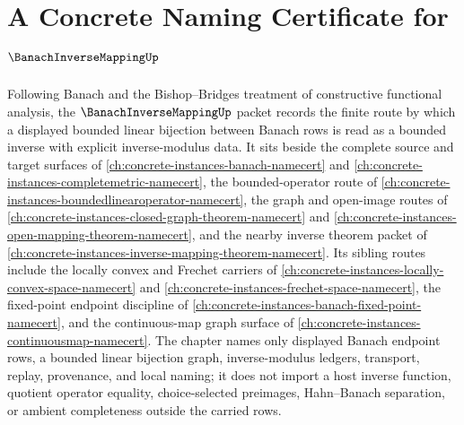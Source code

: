 \chapter{A Concrete Naming Certificate for $\BanachInverseMappingUp$}
\label{ch:concrete-instances-banach-inverse-mapping-namecert}

Following Banach and the Bishop--Bridges treatment of constructive functional analysis, the $\BanachInverseMappingUp$ packet records the finite route by which a displayed bounded linear bijection between Banach rows is read as a bounded inverse with explicit inverse-modulus data. It sits beside the complete source and target surfaces of \autoref{ch:concrete-instances-banach-namecert} and \autoref{ch:concrete-instances-completemetric-namecert}, the bounded-operator route of \autoref{ch:concrete-instances-boundedlinearoperator-namecert}, the graph and open-image routes of \autoref{ch:concrete-instances-closed-graph-theorem-namecert} and \autoref{ch:concrete-instances-open-mapping-theorem-namecert}, and the nearby inverse theorem packet of \autoref{ch:concrete-instances-inverse-mapping-theorem-namecert}. Its sibling routes include the locally convex and Frechet carriers of \autoref{ch:concrete-instances-locally-convex-space-namecert} and \autoref{ch:concrete-instances-frechet-space-namecert}, the fixed-point endpoint discipline of \autoref{ch:concrete-instances-banach-fixed-point-namecert}, and the continuous-map graph surface of \autoref{ch:concrete-instances-continuousmap-namecert}. The chapter names only displayed Banach endpoint rows, a bounded linear bijection graph, inverse-modulus ledgers, transport, replay, provenance, and local naming; it does not import a host inverse function, quotient operator equality, choice-selected preimages, Hahn--Banach separation, or ambient completeness outside the carried rows.

